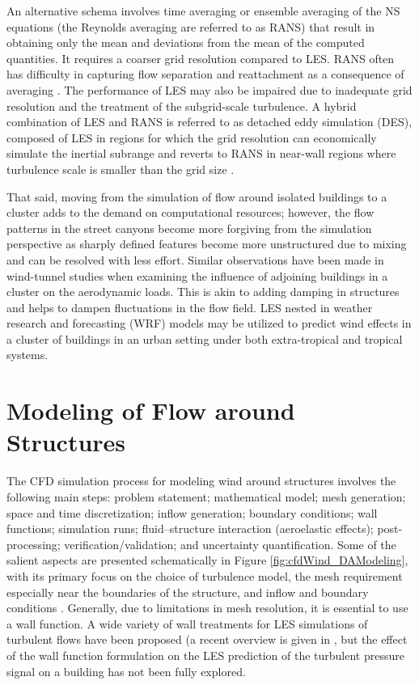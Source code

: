 An alternative schema involves time averaging or ensemble averaging of the NS equations (the Reynolds averaging are referred to as RANS) that result in obtaining only the mean and deviations from the mean of the computed quantities. It requires a coarser grid resolution compared to LES. RANS often has difficulty in capturing flow separation and reattachment as a consequence of averaging \citep{spalart2010reflections}. The performance of LES may also be impaired due to inadequate grid resolution and the treatment of the subgrid-scale turbulence. A hybrid combination of LES and RANS is referred to as detached eddy simulation (DES), composed of LES in regions for which the grid resolution can economically simulate the inertial subrange and reverts to RANS in near-wall regions where turbulence scale is smaller than the grid size \citep{hoarau2016progress}.

That said, moving from the simulation of flow around isolated buildings to a cluster adds to the demand on computational resources; however, the flow patterns in the street canyons become more forgiving from the simulation perspective as sharply defined features become more unstructured due to mixing and can be resolved with less effort. Similar observations have been made in wind-tunnel studies when examining the influence of adjoining buildings in a cluster on the aerodynamic loads. This is akin to adding damping in structures and helps to dampen fluctuations in the flow field. LES nested in weather research and forecasting (WRF) models may be utilized to predict wind effects in a cluster of buildings in an urban setting under both extra-tropical and tropical systems. 

\section{Modeling of Flow around Structures}
\label{sec:resp_cfd_wind_flow_modeling}

The CFD simulation process for modeling wind around structures involves the following main steps: problem statement; mathematical model; mesh generation; space and time discretization; inflow generation; boundary conditions; wall functions; simulation runs; fluid--structure interaction (aeroelastic effects); post-processing; verification/validation; and uncertainty quantification. Some of the salient aspects are presented schematically in Figure \ref{fig:cfdWind_DAModeling}, with its primary focus on the choice of turbulence model, the mesh requirement especially near the boundaries of the structure, and inflow and boundary conditions \citep{ferziger2012computational}. Generally, due to limitations in mesh resolution, it is essential to use a wall function. A wide variety of wall treatments for LES simulations of turbulent flows have been proposed (a recent overview is given in \citep{bose2018wall}, but the effect of the wall function formulation on the LES prediction of the turbulent pressure signal on a building has not been fully explored.

